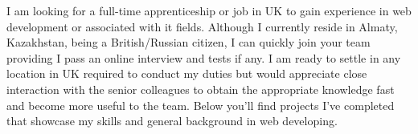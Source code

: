 

\begin{cvparagraph}\centering

\hfill \break
I am looking for a full-time apprenticeship or job in UK to gain experience in web development or associated with it fields. Although I currently reside in Almaty, Kazakhstan, being a British/Russian citizen, I can quickly join your team providing I pass an online interview and tests if any. I am ready to settle in any location in UK required to conduct my duties but would appreciate close interaction with the senior colleagues to obtain the appropriate knowledge fast and become more useful to the team. \break Below you'll find projects I've completed that showcase my skills and general background in web developing.
\end{cvparagraph}
